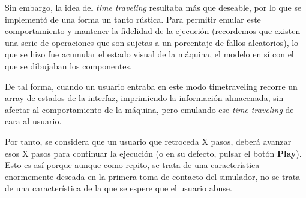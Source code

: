 \bigskip
Sin embargo, la idea del \textit{time traveling} resultaba más que deseable, por lo que se implementó
de una forma un tanto rústica. Para permitir emular este comportamiento y mantener la fidelidad de 
la ejecución (recordemos que existen una serie de operaciones que son sujetas a un porcentaje de fallos
aleatorios), lo que se hizo fue acumular el estado visual de la máquina, el modelo en sí con el 
que se dibujaban los componentes.

\bigskip
De tal forma, cuando un usuario entraba en este modo timetraveling recorre un array de estados de la 
interfaz, imprimiendo la información almacenada, sin afectar al comportamiento de la máquina, pero 
emulando ese \textit{time traveling} de cara al usuario.

\bigskip
Por tanto, se considera que un usuario que retroceda X pasos, deberá avanzar esos X pasos para continuar
la ejecución (o en su defecto, pulsar el botón \textbf{Play}). Esto es así porque aunque como repito, se 
trata de una característica enormemente deseada en la primera toma de contacto del simulador, no se trata
de una característica de la que se espere que el usuario abuse.
